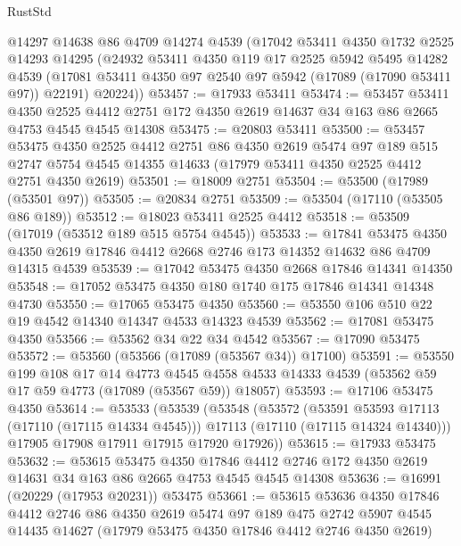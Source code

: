 \begin{lexlean}{RustStd}
\begin{coremodule}
    @14297
    @14638
    @86
    @4709
    @14274
    @4539
    (@17042
      @53411
      @4350
      @1732
      @2525
      @14293
      @14295
      (@24932
        @53411
        @4350
        @119
        @17
        @2525
        @5942
        @5495
        @14282
        @4539
        (@17081 @53411 @4350 @97 @2540 @97 @5942 (@17089 (@17090 @53411 @97)) @22191)
        @20224))
@53457 := @17933 @53411
@53474 := @53457
    @53411
    @4350
    @2525
    @4412
    @2751
    @172
    @4350
    @2619
    @14637
    @34
    @163
    @86
    @2665
    @4753
    @4545
    @4545
    @14308
@53475 := @20803 @53411
@53500 := @53457
    @53475
    @4350
    @2525
    @4412
    @2751
    @86
    @4350
    @2619
    @5474
    @97
    @189
    @515
    @2747
    @5754
    @4545
    @14355
    @14633
    (@17979 @53411 @4350 @2525 @4412 @2751 @4350 @2619)
@53501 := @18009 @2751
@53504 := @53500 (@17989 (@53501 @97))
@53505 := @20834 @2751
@53509 := @53504 (@17110 (@53505 @86 @189))
@53512 := @18023 @53411 @2525 @4412
@53518 := @53509 (@17019 (@53512 @189 @515 @5754 @4545))
@53533 := @17841
    @53475
    @4350
    @4350
    @2619
    @17846
    @4412
    @2668
    @2746
    @173
    @14352
    @14632
    @86
    @4709
    @14315
    @4539
@53539 := @17042 @53475 @4350 @2668 @17846 @14341 @14350
@53548 := @17052 @53475 @4350 @180 @1740 @175 @17846 @14341 @14348 @4730
@53550 := @17065 @53475 @4350
@53560 := @53550 @106 @510 @22 @19 @4542 @14340 @14347 @4533 @14323 @4539
@53562 := @17081 @53475 @4350
@53566 := @53562 @34 @22 @34 @4542
@53567 := @17090 @53475
@53572 := @53560 (@53566 (@17089 (@53567 @34)) @17100)
@53591 := @53550
    @199
    @108
    @17
    @14
    @4773
    @4545
    @4558
    @4533
    @14333
    @4539
    (@53562 @59 @17 @59 @4773 (@17089 (@53567 @59)) @18057)
@53593 := @17106 @53475 @4350
@53614 := @53533
    (@53539
      (@53548
        (@53572
          (@53591 @53593 @17113 (@17110 (@17115 @14334 @4545)))
          @17113
          (@17110 (@17115 @14324 @14340)))
        @17905
        @17908
        @17911
        @17915
        @17920
        @17926))
@53615 := @17933 @53475
@53632 := @53615
    @53475
    @4350
    @17846
    @4412
    @2746
    @172
    @4350
    @2619
    @14631
    @34
    @163
    @86
    @2665
    @4753
    @4545
    @4545
    @14308
@53636 := @16991 (@20229 (@17953 @20231)) @53475
@53661 := @53615
    @53636
    @4350
    @17846
    @4412
    @2746
    @86
    @4350
    @2619
    @5474
    @97
    @189
    @475
    @2742
    @5907
    @4545
    @14435
    @14627
    (@17979 @53475 @4350 @17846 @4412 @2746 @4350 @2619)

\end{coremodule}
\end{lexlean}
